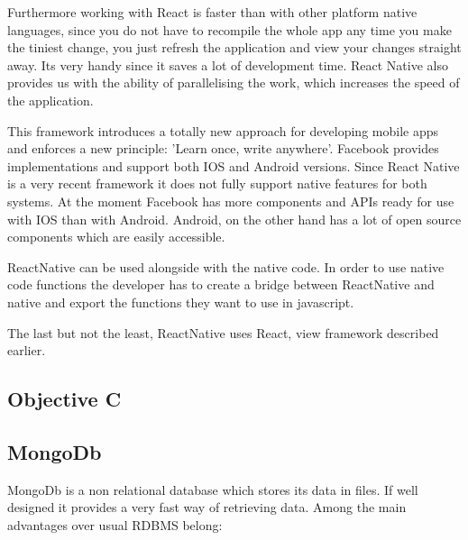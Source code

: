 \documentclass[thesis=M,english]{FITthesis}[2012/10/20]
\begin{document}
Furthermore working with React is faster than with other platform native languages, since you do not have to recompile the whole app any time you make the tiniest change, you just refresh the application and view your changes straight away. Its very handy since it saves a lot of development time. React Native also provides us with the ability of parallelising the work, which increases the speed of the application.

This framework introduces a totally new approach for developing mobile apps and enforces a new principle: 'Learn once, write anywhere'. Facebook provides implementations and support both IOS and Android versions. Since React Native is a very recent framework it does not fully support native features for both systems. At the moment Facebook has more components and APIs ready for use with IOS than with Android. Android, on the other hand has a lot of open source components which are easily accessible.

ReactNative can be used alongside with the native code. In order to use native code functions the developer has to create a bridge between ReactNative and native and export the functions they want to use in javascript.

The last but not the least, ReactNative uses React, view framework described earlier.

\subsection{Objective C}

\subsection{MongoDb}
MongoDb is a non relational database which stores its data in files. If well designed it provides a very fast way of retrieving data. Among the main advantages over usual RDBMS belong:
\end{document}
